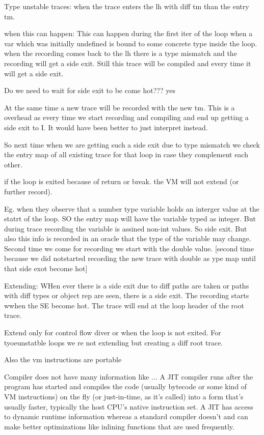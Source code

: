 Type unstable traces:
when the trace enters the lh with diff tm than the entry tm. 

when this can happen: This can happen during the first iter of the 
loop when a var which was initially undefined is bound to some concrete type inside
the loop. when the recording comes back to the lh there is a type mismatch
and the recording will get  a side exit. Still this trace will be compiled 
and every time it will get a side exit.

Do we need to wait for side exit to be come hot???  yes

At the same time a new trace will be recorded with the 
new tm. 
This is a overhead as every time we start recording and compiling and end up getting a 
side exit to I. It would have been better to just interpret instead.

So next time when we are getting such a side exit due to type mismatch
we check the entry map of all existing trace for that loop in case they complement each other.


if the loop is exited because of return or break. the VM will not extend (or further record).

Eg. when they observe that a number type variable holds an interger value at the statrt of 
the loop. SO the entry map will have the variable typed as integer.
But during trace recording the variable is assined non-int values. So
side exit.
But also this info is recorded in an oracle that the type
of the variable may change. Second time we come for recording
we start with the double value. [second time because we did notstarted recording the 
new trace with double as ype map until that side exot become hot]


Extending:
WHen ever there is a side exit due to diff paths are taken or paths with diff types or object rep 
are seen, there is a side exit. The recording starts wwhen the SE become hot.
The trace will end at the loop header of the root trace.

Extend only for control flow diver or when the loop is not exited.
For tyoeunstatble loops we re not extending but creating a diff root trace.






Also the vm instructions are portable
\item
Compiler does not have many information like ...
A JIT compiler runs after the program has started and compiles the code
(usually bytecode or some kind of VM instructions) on the fly (or just-in-time,
    as it's called) into a form that's usually faster, typically the host CPU's
native instruction set. A JIT has access to dynamic runtime information whereas
a standard compiler doesn't and can make better optimizations like inlining
functions that are used frequently.

